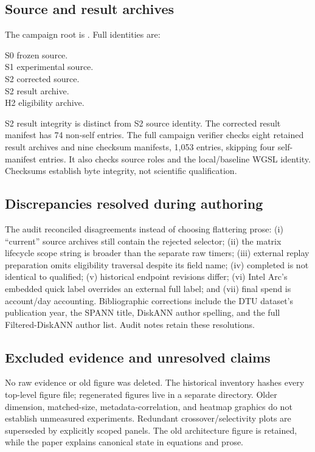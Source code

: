 \subsection{Source and result archives}
The campaign root is . Full identities are:
\begin{description}
\item[S0 frozen source.] 
\item[S1 experimental source.] 
\item[S2 corrected source.] 
\item[S2 result archive.] 
\item[H2 eligibility archive.] 
\end{description}
S2 result integrity is distinct from S2 source identity. The corrected result manifest has 74 non-self entries. The full campaign verifier checks eight retained result archives and nine checksum manifests, 1,053 entries, skipping four self-manifest entries. It also checks source roles and the local/baseline WGSL identity. Checksums establish byte integrity, not scientific qualification.

\subsection{Discrepancies resolved during authoring}
The audit reconciled disagreements instead of choosing flattering prose: (i) ``current'' source archives still contain the rejected selector; (ii) the matrix lifecycle scope string is broader than the separate raw timers; (iii) external replay preparation omits eligibility traversal despite its field name; (iv) completed is not identical to qualified; (v) historical endpoint revisions differ; (vi) Intel Arc's embedded quick label overrides an external full label; and (vii) final spend is account/day accounting. Bibliographic corrections include the DTU dataset's publication year, the SPANN title, DiskANN author spelling, and the full Filtered-DiskANN author list. Audit notes retain these resolutions.

\subsection{Excluded evidence and unresolved claims}
No raw evidence or old figure was deleted. The historical inventory hashes every top-level figure file; regenerated figures live in a separate  directory. Older dimension, matched-size, metadata-correlation, and heatmap graphics do not establish unmeasured experiments. Redundant crossover/selectivity plots are superseded by explicitly scoped panels. The old architecture figure is retained, while the paper explains canonical state in equations and prose.

